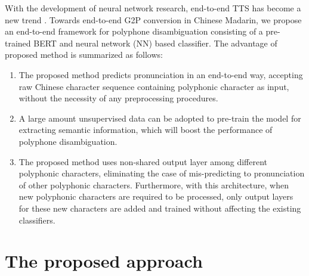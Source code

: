 \documentclass[a4paper]{article}
\begin{document}
With the development of neural network research, end-to-end TTS has become a new trend \cite{sotelo2017char2wav, wang2017tacotron, li2018close}. Towards end-to-end G2P conversion in Chinese Madarin, we propose an end-to-end framework for polyphone disambiguation consisting of a pre-trained BERT \cite{devlin2018bert} and neural network (NN) based classifier. The advantage of proposed method is summarized as follows:
\begin{enumerate}
	\item The proposed method predicts pronunciation in an end-to-end way, accepting raw Chinese character sequence containing polyphonic character as input, without the necessity of any preprocessing procedures.
	\item A large amount unsupervised data can be adopted to pre-train the model for extracting semantic information, which will boost the performance of polyphone disambiguation.
	\item The proposed method uses non-shared output layer among different polyphonic characters, eliminating the case of mis-predicting to pronunciation of other polyphonic characters. Furthermore, with this architecture, when new polyphonic characters are required to be processed, only output layers for these new characters are added and trained without affecting the existing classifiers.
\end{enumerate}


\section{The proposed approach}
\end{document}
